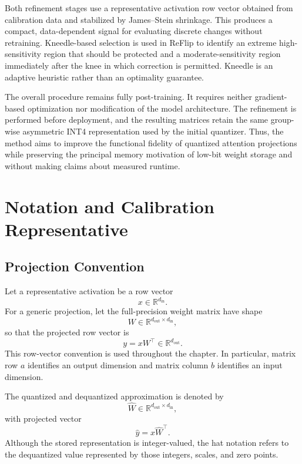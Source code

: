 Both refinement stages use a representative activation row vector obtained from calibration data and stabilized by James--Stein shrinkage. This produces a compact, data-dependent signal for evaluating discrete changes without retraining. Kneedle-based selection is used in ReFlip to identify an extreme high-sensitivity region that should be protected and a moderate-sensitivity region immediately after the knee in which correction is permitted. Kneedle is an adaptive heuristic rather than an optimality guarantee.

The overall procedure remains fully post-training. It requires neither gradient-based optimization nor modification of the model architecture. The refinement is performed before deployment, and the resulting matrices retain the same group-wise asymmetric INT4 representation used by the initial quantizer. Thus, the method aims to improve the functional fidelity of quantized attention projections while preserving the principal memory motivation of low-bit weight storage and without making claims about measured runtime.

\section{Notation and Calibration Representative}

\subsection{Projection Convention}

Let a representative activation be a row vector
\begin{equation}
x \in \mathbb{R}^{d_{\mathrm{in}}}.
\end{equation}
For a generic projection, let the full-precision weight matrix have shape
\begin{equation}
W \in \mathbb{R}^{d_{\mathrm{out}} \times d_{\mathrm{in}}},
\end{equation}
so that the projected row vector is
\begin{equation}
y=xW^\top\in\mathbb{R}^{d_{\mathrm{out}}}.
\end{equation}
This row-vector convention is used throughout the chapter. In particular, matrix row $a$ identifies an output dimension and matrix column $b$ identifies an input dimension.

The quantized and dequantized approximation is denoted by
\begin{equation}
\hat W\in\mathbb{R}^{d_{\mathrm{out}} \times d_{\mathrm{in}}},
\end{equation}
with projected vector
\begin{equation}
\hat y=x\hat W^\top.
\end{equation}
Although the stored representation is integer-valued, the hat notation refers to the dequantized value represented by those integers, scales, and zero points.

